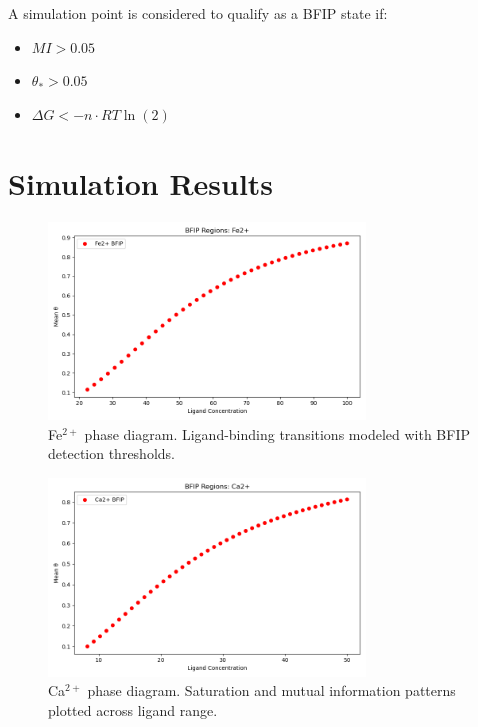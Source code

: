 \documentclass[11pt]{article}
\begin{document}
A simulation point is considered to qualify as a BFIP state if:

\begin{itemize}
    \item $MI > 0.05$
    \item $\theta_* > 0.05$
    \item $\Delta G < -n \cdot RT \ln(2)$
\end{itemize}

\section{Simulation Results}

\begin{figure}[h]
    \centering
    \includegraphics[width=0.75\textwidth]{figures/bio_phase_diagram_Fe2+.png}
    \caption{Fe$^{2+}$ phase diagram. Ligand-binding transitions modeled with BFIP detection thresholds.}
    \label{fig:fe2_phase}
\end{figure}

\begin{figure}[h]
    \centering
    \includegraphics[width=0.75\textwidth]{figures/bio_phase_diagram_Ca2+.png}
    \caption{Ca$^{2+}$ phase diagram. Saturation and mutual information patterns plotted across ligand range.}
    \label{fig:ca2_phase}
\end{figure}
\end{document}
